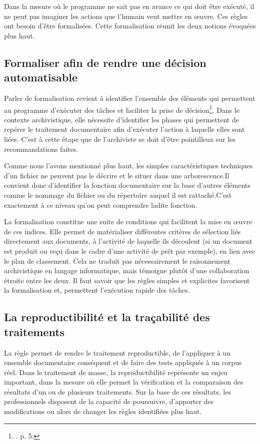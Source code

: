 Dans la mesure où le programme ne sait pas en avance ce qui doit être exécuté, il ne peut pas imaginer les actions que l'humain veut mettre en œuvre. Ces règles ont besoin d’être formalisées. Cette formalisation réunit les deux notions évoquées plus haut.


\subsection*{Formaliser afin de rendre une décision automatisable}

Parler de formalisation revient à identifier l'ensemble des éléments qui permettent au programme d’exécuter des tâches et  faciliter la prise de décision\footnote{\cite{da-silva-santos-heiniger-2024}. p. 5.}. Dans le contexte archivistique,  elle nécessite d'identifier les phases qui permettent de repérer le traitement documentaire afin d’exécuter l'action à laquelle elles sont liées. C'est à cette étape que de l'archiviste se doit d'être pointilleux sur les recommandations faites. 

Comme nous l'avons mentionné plus haut, les simples caractéristiques techniques d'un fichier ne peuvent pas le décrire et le situer dans une arborescence.Il convient donc d'identifier la fonction documentaire sur la base d'autres éléments comme le nommage du fichier ou du répertoire auquel il est rattaché.C'est exactement à ce niveau qu'on peut comprendre ladite fonction.

La formalisation constitue une suite de conditions qui facilitent la mise en œuvre de ces indices. Elle permet de matérialiser différentes critères de sélection liés directement aux documents, à l'activité de laquelle ils découlent (si un document est produit ou reçu dans le cadre d'une activité de prêt par exemple), en lien avec le plan de classement. Cela ne traduit pas nécessairement le raisonnement archivistique en langage informatique, mais témoigne plutôt d'une collaboration étroite entre les deux. Il faut savoir que les règles simples et explicites favorisent la formalisation et, permettent l'exécution rapide des tâches.


\subsection*{La reproductibilité et la traçabilité des traitements}

La règle permet de rendre le traitement reproductible, de l'appliquer à un ensemble documentaire conséquent et de faire des tests appliqués à un corpus réel. Dans le traitement de masse, la reproductibilité représente un enjeu important, dans la mesure où elle permet la vérification et la comparaison des résultats d'un ou de plusieurs traitements. Sur la base de ces résultats, les professionnels disposent de la capacité de poursuivre, d'apporter des modifications ou alors de changer les règles identifiées plus haut.

